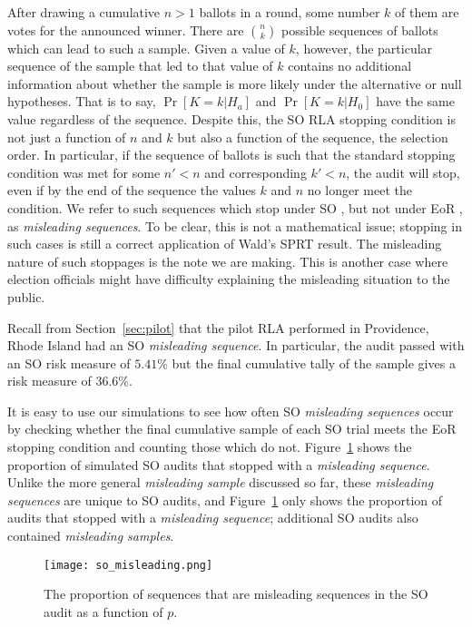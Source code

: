 After drawing a cumulative $n>1$ ballots in a round, some number $k$ of them are votes for the announced winner. There are $\binom{n}{k}$ possible sequences of ballots which can lead to such a sample. Given a value of $k$, however, the particular sequence of the sample that led to that value of $k$ contains no additional information about whether the sample is more likely under the alternative or null hypotheses. That is to say, $\Pr[K=k|H_a]$ and $\Pr[K=k|H_0]$ have the same value regardless of the sequence.
Despite this, the SO \BRAVO RLA stopping condition is not just a function of $n$ and $k$ but also a function of the sequence, the selection order. In particular, if the sequence of ballots is such that the standard \BRAVO stopping condition was met for some $n'<n$ and corresponding $k'<n$, the audit will stop, even if by the end of the sequence the values $k$ and $n$ no longer meet the \BRAVO condition. We refer to such sequences which stop under SO \BRAVO, but not under EoR \BRAVO, as \emph{misleading sequences}. To be clear, this is not a mathematical issue; stopping in such cases is still a correct application of Wald's SPRT result\cite{wald}. The misleading nature of such stoppages is the note we are making. This is another case where election officials might have difficulty explaining the misleading situation to the public.

Recall from Section~\ref{sec:pilot} that the pilot \Providence RLA performed in Providence, Rhode Island had an SO \BRAVO \emph{misleading sequence}. In particular, the audit passed with an SO \BRAVO risk measure of $5.41\%$ but the final cumulative tally of the sample gives a \BRAVO risk measure of $36.6\%$.

It is easy to use our simulations to see how often SO \BRAVO \emph{misleading sequences} occur by checking whether the final cumulative sample of each SO \BRAVO trial meets the EoR \BRAVO stopping condition and counting those which do not. Figure~\ref{so_misleading} shows the proportion of simulated SO \BRAVO audits that stopped with a \emph{misleading sequence}. Unlike the more general \emph{misleading sample} discussed so far, these \emph{misleading sequences} are unique to SO \BRAVO audits, and Figure~\ref{so_misleading} only shows the proportion of audits that stopped with a \emph{misleading sequence}; additional SO \BRAVO audits also contained \emph{misleading samples}.

\begin{figure}
\texttt{[image: so\_misleading.png]}
\caption{The proportion of sequences that are misleading sequences in the SO \BRAVO audit as a function of $p$.}
\label{so_misleading}
\end{figure}




